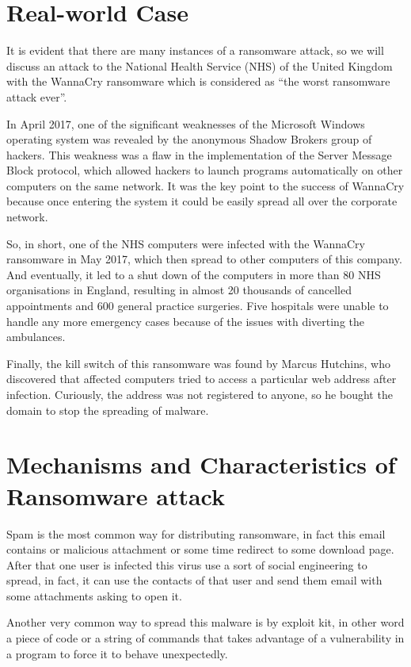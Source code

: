 \documentclass{article}
\begin{document}
\section{Real-world Case}
    It is evident that there are many instances of a ransomware attack, so we will discuss an attack to the National Health Service (NHS) of the United Kingdom with the WannaCry ransomware which is considered as “the worst ransomware attack ever”. \cite{cit7}

	In April 2017, one of the significant weaknesses of the Microsoft Windows operating system was revealed by the anonymous Shadow Brokers group of hackers. This weakness was a flaw in the implementation of the Server Message Block protocol, which allowed hackers to launch programs automatically on other computers on the same network. It was the key point to the success of WannaCry because once entering the system it could be easily spread all over the corporate network.

	So, in short, one of the NHS computers were infected with the WannaCry ransomware in May 2017, which then spread to other computers of this company. And eventually, it led to a shut down of the computers in more than 80 NHS organisations in England, resulting in almost 20 thousands of cancelled appointments and 600 general practice surgeries. Five hospitals were unable to handle any more emergency cases because of the issues with diverting the ambulances.

	Finally, the kill switch of this ransomware was found by Marcus Hutchins, who discovered that affected computers tried to access a particular web address after infection. Curiously, the address was not registered to anyone, so he bought the domain to stop the spreading of malware.


    
\section{Mechanisms and Characteristics of Ransomware attack}
    Spam is the most common way for distributing ransomware, in fact this email contains or malicious attachment or some time redirect to some download page. After that one user is infected this virus use a sort of social engineering to spread, in fact, it can use the contacts of that user and send them email with some attachments asking to open it.\cite{cit9}

    Another very common way to spread this malware is by exploit kit, in other word a piece of code or a string of commands that takes advantage of a vulnerability in a program to force it to behave unexpectedly. \cite{cit10}
    
\end{document}
